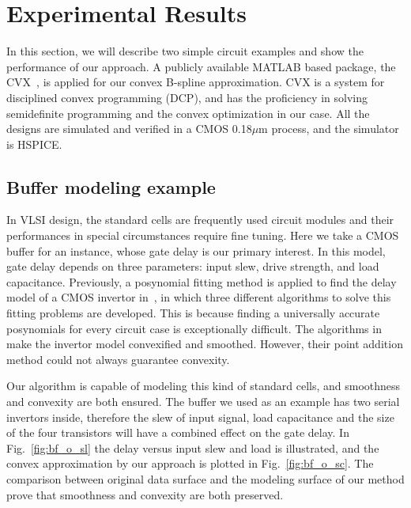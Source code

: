 \documentclass{sig-alternate}
\begin{document}
\section{Experimental Results}\label{sec:example}
In this section, we will describe two simple circuit examples and show
the performance of our approach. A publicly available MATLAB based
package, the CVX~\cite{cvx_pack}, is applied for our convex B-spline
approximation. CVX is a system for disciplined convex
programming (DCP), and has the proficiency in solving semidefinite
programming and the convex optimization in our case. 
All the designs are simulated and verified in a CMOS 0.18$\mu$m
process, and the simulator is HSPICE.

\subsection{Buffer modeling example}
In VLSI design, the standard cells are frequently used circuit modules
and their performances in special circumstances require fine
tuning. Here we take a CMOS buffer for an instance, whose
gate delay is our primary interest. In this model, gate
delay depends on three parameters: input slew, drive strength, and
load capacitance. Previously, a posynomial fitting method is applied
to find the delay model of a CMOS invertor in~\cite{Roy_05}, in which
three different algorithms to solve this fitting problems are
developed. This is because finding a universally accurate posynomials
for every circuit case is exceptionally difficult. The algorithms
in~\cite{Roy_05}
make the invertor model convexified and smoothed. However, their point
addition method could not always guarantee convexity.

Our algorithm is capable of modeling this kind of standard cells, and
smoothness and convexity are both ensured. The buffer we used as an
example has two serial invertors inside, 
therefore the slew of input signal, load capacitance and the size of
the four transistors will have a combined effect on the gate delay. In
Fig.~\ref{fig:bf_o_sl} the delay versus input slew 
and load is illustrated, and the convex approximation by our approach 
is plotted in Fig.~\ref{fig:bf_o_sc}. The comparison
between original data surface and the modeling surface of our
method prove that smoothness and convexity are both preserved. 
\end{document}
